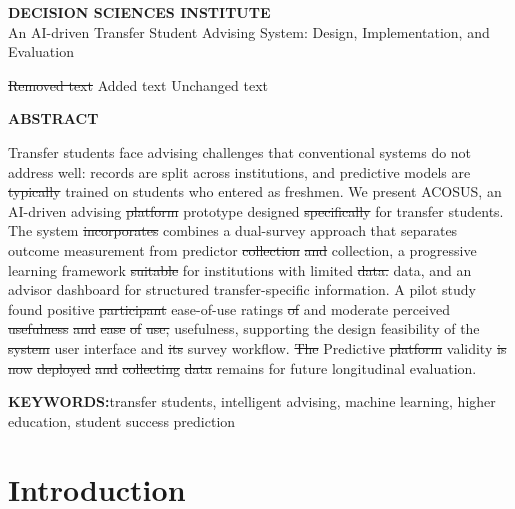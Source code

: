 \documentclass[letterpaper,11pt]{article}
\newcommand{\DIFdel}[1]{%
  \begingroup\setlength{\fboxsep}{0.5pt}%
  \colorbox{diffdelbg}{\textcolor{diffdeltext}{\sout{#1}}}%
  \endgroup}
\newcommand{\DIFadd}[1]{%
  \begingroup\setlength{\fboxsep}{0.5pt}%
  \colorbox{diffaddbg}{\textcolor{diffaddtext}{#1}}%
  \endgroup}
\newcommand{\DIFlegend}{%
  \begin{center}\small
  \DIFdel{Removed text}\quad\DIFadd{Added text}\quad Unchanged text
  \end{center}\medskip}
\begin{document}
\begin{center}
\textbf{DECISION SCIENCES INSTITUTE}\\[6pt]
An AI-driven Transfer Student Advising System: Design, Implementation, and Evaluation
\end{center}
\DIFlegend

\bigskip

\begin{center}
\textbf{ABSTRACT}
\end{center}

Transfer students face advising challenges that conventional systems do not address well: records are split across institutions, and predictive models are \DIFdel{typically} trained on students who entered as freshmen. We present ACOSUS, an AI-driven advising \DIFdel{platform} \DIFadd{prototype} designed \DIFdel{specifically} for transfer students. The system \DIFdel{incorporates} \DIFadd{combines} a dual-survey approach that separates outcome measurement from predictor \DIFdel{collection} \DIFdel{and} \DIFadd{collection,} a progressive learning framework \DIFdel{suitable} for institutions with limited \DIFdel{data.} \DIFadd{data,} \DIFadd{and} \DIFadd{an} \DIFadd{advisor} \DIFadd{dashboard} \DIFadd{for} \DIFadd{structured} \DIFadd{transfer-specific} \DIFadd{information.} A pilot study found positive \DIFdel{participant} \DIFadd{ease-of-use} ratings \DIFdel{of} \DIFadd{and} \DIFadd{moderate} perceived \DIFdel{usefulness} \DIFdel{and} \DIFdel{ease} \DIFdel{of} \DIFdel{use,} \DIFadd{usefulness,} supporting the \DIFadd{design} feasibility of the \DIFdel{system} \DIFadd{user} \DIFadd{interface} and \DIFdel{its} survey workflow. \DIFdel{The} \DIFadd{Predictive} \DIFdel{platform} \DIFadd{validity} \DIFdel{is} \DIFdel{now} \DIFdel{deployed} \DIFdel{and} \DIFdel{collecting} \DIFdel{data} \DIFadd{remains} for future \DIFadd{longitudinal} evaluation.

\bigskip

\noindent\textbf{KEYWORDS:}\quad transfer students, intelligent advising, machine learning, higher education, student success prediction

\section{Introduction}\label{sec:introduction}
\end{document}
